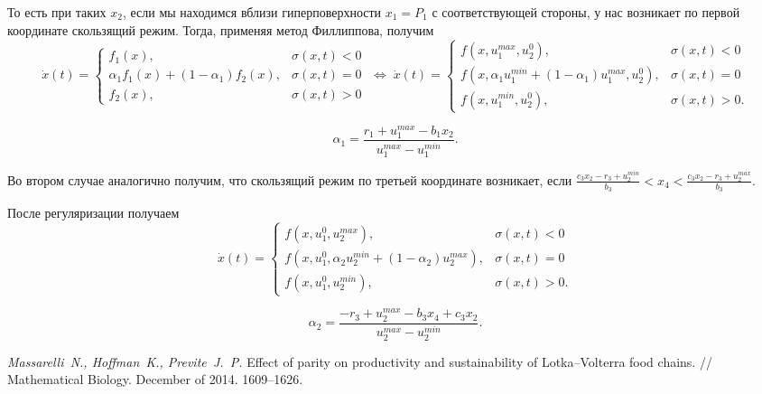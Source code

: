 \documentclass[11pt]{article}
\begin{document}
То есть при таких $x_2$, если мы находимся вблизи гиперповерхности $x_1 = P_1$ с соответствующей стороны, у нас возникает по первой координате скользящий режим. Тогда, применяя метод Филлиппова, получим 
$$
\dot x(t) = \begin{cases} f_1(x), & \sigma(x,t) < 0 \\ \alpha_1 f_1(x) + (1 - \alpha_1) f_2(x), & \sigma(x,t) = 0 \\ f_2(x), & \sigma(x,t) > 0\end{cases} \; \Leftrightarrow \; \dot x(t) = \begin{cases} f(x,u_1^{max}, u_2^0), & \sigma(x,t) < 0 \\ f(x, \alpha_1 u_1^{min} + (1-\alpha_1)u_1^{max}, u_2^0), & \sigma(x,t) = 0 \\ f(x, u_1^{min}, u_2^0), & \sigma(x,t) > 0.\end{cases}
$$

$$\alpha_1 = \frac{r_1 + u_1^{max} - b_1x_2}{u_1^{max} - u_1^{min}}.$$

Во втором случае аналогично получим, что скользящий режим по третьей координате возникает, если $\frac{c_3x_2 - r_3 + u_2^{min}}{b_3} < x_4 < \frac{c_3x_2 - r_3 + u_2^{max}}{b_3}.$

После регуляризации получаем
$$
\dot x(t) = \begin{cases} f(x,u_1^0, u_2^{max}), & \sigma(x,t) < 0 \\ f(x, u_1^0, \alpha_2 u_2^{min} + (1-\alpha_2)u_2^{max}), & \sigma(x,t) = 0 \\ f(x, u_1^0, u_2^{min}), & \sigma(x,t) > 0.\end{cases}
$$

$$\alpha_2 = \frac{-r_3 + u_2^{max} - b_3x_4 + c_3x_2}{u_2^{max} - u_2^{min}}.$$

%

\clearpage
\newpage
\begin{thebibliography}{0}
 {\it Massarelli~N., Hoffman~K., Previte~J.~P.} Effect of parity on productivity and sustainability of Lotka–Volterra food chains. // Mathematical Biology. December of 2014. 1609--1626.
\end{thebibliography}
\end{document}
